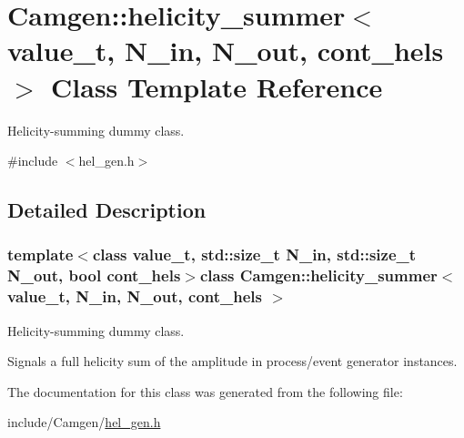 \hypertarget{a00279}{}\section{Camgen\+:\+:helicity\+\_\+summer$<$ value\+\_\+t, N\+\_\+in, N\+\_\+out, cont\+\_\+hels $>$ Class Template Reference}
\label{a00279}


Helicity-\/summing dummy class.  




{\ttfamily \#include $<$hel\+\_\+gen.\+h$>$}



\subsection{Detailed Description}
\subsubsection*{template$<$class value\+\_\+t, std\+::size\+\_\+t N\+\_\+in, std\+::size\+\_\+t N\+\_\+out, bool cont\+\_\+hels$>$class Camgen\+::helicity\+\_\+summer$<$ value\+\_\+t, N\+\_\+in, N\+\_\+out, cont\+\_\+hels $>$}

Helicity-\/summing dummy class. 

Signals a full helicity sum of the amplitude in process/event generator instances. 

The documentation for this class was generated from the following file\+:\begin{DoxyCompactItemize}
\item 
include/\+Camgen/\hyperlink{a00659}{hel\+\_\+gen.\+h}\end{DoxyCompactItemize}
